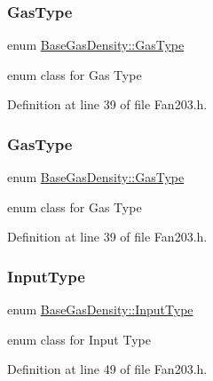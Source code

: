 \subsubsection{\texorpdfstring{Gas\+Type}{GasType}\hspace{0.1cm}{\footnotesize\ttfamily [2/3]}}
{\footnotesize\ttfamily enum \hyperlink{class_base_gas_density_afb215e48f6193462521b7e8d47306ed3}{Base\+Gas\+Density\+::\+Gas\+Type}\hspace{0.3cm}{\ttfamily [strong]}}

enum class for Gas Type 

Definition at line 39 of file Fan203.\+h.

\mbox{\label{class_base_gas_density_afb215e48f6193462521b7e8d47306ed3}} 
\subsubsection{\texorpdfstring{Gas\+Type}{GasType}\hspace{0.1cm}{\footnotesize\ttfamily [3/3]}}
{\footnotesize\ttfamily enum \hyperlink{class_base_gas_density_afb215e48f6193462521b7e8d47306ed3}{Base\+Gas\+Density\+::\+Gas\+Type}\hspace{0.3cm}{\ttfamily [strong]}}

enum class for Gas Type 

Definition at line 39 of file Fan203.\+h.

\mbox{\label{class_base_gas_density_a54f846cc4683a49d3904a40fe2986772}} 
\subsubsection{\texorpdfstring{Input\+Type}{InputType}\hspace{0.1cm}{\footnotesize\ttfamily [1/3]}}
{\footnotesize\ttfamily enum \hyperlink{class_base_gas_density_a54f846cc4683a49d3904a40fe2986772}{Base\+Gas\+Density\+::\+Input\+Type}\hspace{0.3cm}{\ttfamily [strong]}}

enum class for Input Type 

Definition at line 49 of file Fan203.\+h.


